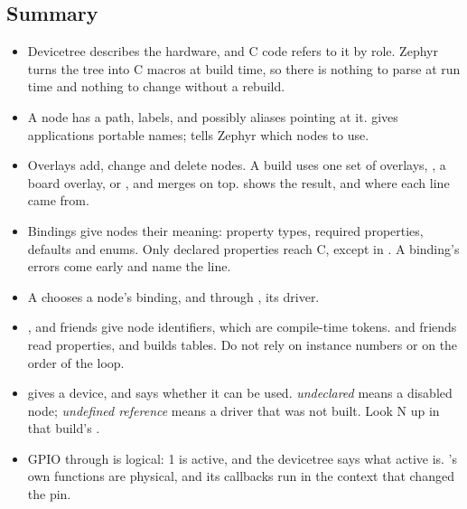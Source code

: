 \subsection{Summary}
\begin{itemize}
  \item Devicetree describes the hardware, and C code refers to it by role. Zephyr turns the tree into C
    macros at build time, so there is nothing to parse at run time and nothing to change without a
    rebuild.
  \item A node has a path, labels, and possibly aliases pointing at it.  gives applications
    portable names;  tells Zephyr which nodes to use.
  \item Overlays add, change and delete nodes. A build uses one set of overlays, , a
    board overlay, or , and merges  on top.
     shows the result, and where each line came from.
  \item Bindings give nodes their meaning: property types, required properties, defaults and enums. Only
    declared properties reach C, except in . A binding’s errors come early and name
    the line.
  \item A  chooses a node’s binding, and through , its
    driver.
  \item {},  and friends give node identifiers, which are compile-time
    tokens.  and friends read properties, and  builds
    tables. Do not rely on instance numbers or on the order of the loop.
  \item {} gives a device, and  says whether it can be used.
     \emph{undeclared} means a disabled node; \emph{undefined reference} means
    a driver that was not built. Look N up in that build’s .
  \item GPIO through  is logical: 1 is active, and the devicetree says what active is.
    ’s own functions are physical, and its callbacks run in the context that changed the
    pin.
\end{itemize}
